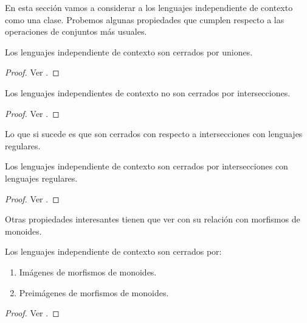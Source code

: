\documentclass[tesis.tex]{subfiles}
\newcommand{\ic}{independiente de contexto }
\begin{document}
En esta sección vamos a considerar a los lenguajes \ic como una clase. 
Probemos algunas propiedades que cumplen respecto a las operaciones de conjuntos más usuales.

\begin{prop}
	Los lenguajes \ic son cerrados por uniones.
\end{prop}
\begin{proof}
	Ver \cite{hopcraft-ullman}.
\end{proof}

\begin{prop}
	Los lenguajes independientes de contexto no son cerrados por intersecciones.
\end{prop}

\begin{proof}
	Ver \cite{hopcraft-ullman}.
\end{proof}

Lo que si sucede es que son cerrados con respecto a intersecciones con lenguajes regulares.

\begin{prop}\label{intersecciones-reg-ic}
	Los lenguajes \ic son cerrados por intersecciones con lenguajes regulares.
\end{prop}

\begin{proof}
	Ver \cite{hopcraft-ullman}.
\end{proof}

Otras propiedades interesantes tienen que ver con su relación con morfismos de monoides. 

\begin{prop}\label{morfismos-monoides-ic}
	Los lenguajes \ic son cerrados por:
	\begin{enumerate}
		\item Imágenes de morfismos de monoides.
		\item Preimágenes de morfismos de monoides.
	\end{enumerate}
\end{prop}
\begin{proof}
	Ver \cite{sipser13}.
\end{proof}
\end{document}
